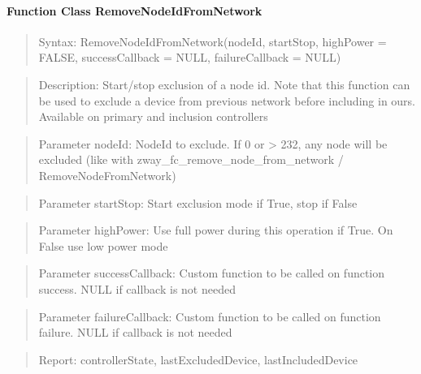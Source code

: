 \paragraph{Function Class RemoveNodeIdFromNetwork}
\begin{quote}Syntax: RemoveNodeIdFromNetwork(nodeId, startStop, highPower = FALSE, successCallback = NULL, failureCallback = NULL)\end{quote}
\begin{quote}Description: Start/stop exclusion of a node id. Note that this function can be used to exclude a device from previous network before including in ours. Available on primary and inclusion controllers\end{quote}
\begin{quote}Parameter nodeId: NodeId to exclude. If 0 or > 232, any node will be excluded (like with zway\_fc\_remove\_node\_from\_network / RemoveNodeFromNetwork)\end{quote}
\begin{quote}Parameter startStop: Start exclusion mode if True, stop if False\end{quote}
\begin{quote}Parameter highPower: Use full power during this operation if True. On False use low power mode\end{quote}
\begin{quote}Parameter successCallback: Custom function to be called on function success. NULL if callback is not needed\end{quote}
\begin{quote}Parameter failureCallback: Custom function to be called on function failure. NULL if callback is not needed\end{quote}
\begin{quote}Report: controllerState, lastExcludedDevice, lastIncludedDevice\end{quote}

